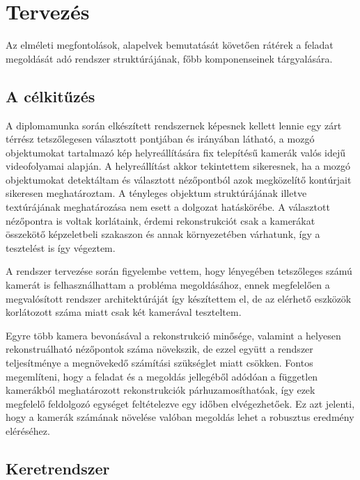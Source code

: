 \chapter{Tervezés \label{chapter3}}

Az elméleti megfontolások, alapelvek bemutatását követően rátérek a feladat megoldását adó rendszer struktúrájának, főbb komponenseinek tárgyalására.

\section{A célkitűzés}

A diplomamunka során elkészített rendszernek képesnek kellett lennie egy zárt térrész tetszőlegesen választott pontjában és irányában látható, a mozgó objektumokat tartalmazó kép helyreállítására fix telepítésű kamerák valós idejű videofolyamai alapján. A helyreállítást akkor tekintettem sikeresnek, ha a mozgó objektumokat detektáltam és választott nézőpontból azok megközelítő kontúrjait sikeresen meghatároztam. A tényleges objektum struktúrájának illetve textúrájának meghatározása nem esett a dolgozat hatáskörébe. A választott nézőpontra is voltak korlátaink, érdemi rekonstrukciót csak a kamerákat összekötő képzeletbeli szakaszon és annak környezetében várhatunk, így a tesztelést is így végeztem.

A rendszer tervezése során figyelembe vettem, hogy lényegében tetszőleges számú kamerát is felhasználhattam a probléma megoldásához, ennek megfelelően a megvalósított rendszer architektúráját így készítettem el, de az elérhető eszközök korlátozott száma miatt csak két kamerával teszteltem.

Egyre több kamera bevonásával a rekonstrukció minősége, valamint a helyesen rekonstruálható nézőpontok száma növekszik, de ezzel együtt a rendszer teljesítménye a megnövekedő számítási szükséglet miatt csökken. Fontos megemlíteni, hogy a feladat és a megoldás jellegéből adódóan a független kamerákból meghatározott rekonstrukciók párhuzamosíthatóak, így ezek megfelelő feldolgozó egységet feltételezve egy időben elvégezhetőek. Ez azt jelenti, hogy a kamerák számának növelése valóban megoldás lehet a robusztus eredmény eléréséhez.

\section{Keretrendszer}


